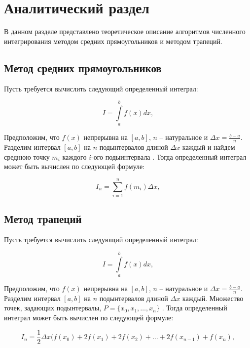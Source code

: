 \section{Аналитический раздел \hfill}
\vspace{\baselineskip}

В данном разделе представлено теоретическое описание алгоритмов численного интегрирования методом средних прямоугольников и методом трапеций.


\subsection{Метод средних прямоугольников}

Пусть требуется вычислить следующий определенный интеграл:

\begin{equation}\label{eq1}
    I = \int\limits_a^b f(x)dx,
\end{equation}

Предположим, что $f(x)$ непрерывна на $[a,b]$, $n$ -- натуральное и $\Delta x = \frac{b-a}{n}$. Разделим интервал $[a,b]$ на $n$ подынтервалов длиной $\Delta x$ каждый и найдем среднюю точку $m_i$ каждого $i$-ого подыинтервала \cite{integrals}. Тогда определенный интеграл может быть вычислен по следующей формуле:
    
\begin{equation}\label{eq2}
    I_n = \sum\limits_{i=1}^{n} f(m_i) \Delta x,
\end{equation}

\subsection{Метод трапеций}

Пусть требуется вычислить следующий определенный интеграл:

\begin{equation}\label{eq3}
    I = \int\limits_a^b f(x)dx,
\end{equation}

Предположим, что $f(x)$ непрерывна на $[a,b]$, $n$ -- натуральное и $\Delta x = \frac{b-a}{n}$. Разделим интервал $[a,b]$ на $n$ подынтервалов длиной $\Delta x$ каждый. Множество точек, задающих подынтервалы, $P = \{x_0, x_1, \dots, x_n\}$ \cite{integrals}. Тогда определенный интеграл может быть вычислен по следующей формуле:
    
\begin{equation}\label{eq4}
    I_n = \frac{1}{2} \Delta x(f(x_0) + 2f(x_1) + 2f(x_2) + \dots + 2f(x_{n-1}) + f(x_n),
\end{equation}

